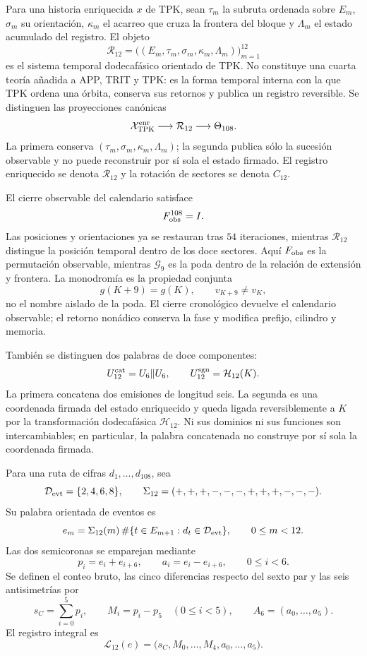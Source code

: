 Para una historia enriquecida \(x\) de TPK, sean \(\tau_m\) la subruta
ordenada sobre \(E_m\), \(\sigma_m\) su orientación, \(\kappa_m\) el acarreo
que cruza la frontera del bloque y \(\Lambda_m\) el estado acumulado del
registro. El objeto
\[
 \mathcal R_{12}
 =\bigl((E_m,\tau_m,\sigma_m,\kappa_m,\Lambda_m)\bigr)_{m=1}^{12}
\]
es el sistema temporal dodecafásico orientado de TPK. No constituye una cuarta
teoría añadida a APP, TRIT y TPK: es la forma temporal interna con la que
TPK ordena una órbita, conserva sus retornos y publica un registro
reversible. Se distinguen las proyecciones canónicas
\[
 \mathcal X_{\rm TPK}^{\rm enr}
 \longrightarrow \mathcal R_{12}
 \longrightarrow \Theta_{108}.
\]
La primera conserva \((\tau_m,\sigma_m,\kappa_m,\Lambda_m)\); la segunda
publica sólo la sucesión observable y no puede reconstruir por sí sola el
estado firmado. El registro enriquecido se denota \(\mathcal R_{12}\) y la
rotación de sectores se denota \(C_{12}\).

El cierre observable del calendario satisface
\[
 F_{\rm obs}^{108}=I.
\]
Las posiciones y orientaciones ya se restauran tras \(54\) iteraciones,
mientras \(\mathcal R_{12}\) distingue la posición temporal dentro de los
doce sectores. Aquí \(F_{\rm obs}\) es la permutación observable, mientras
\(\mathcal G_9\) es la poda dentro de la relación de extensión y frontera.
La monodromía es la propiedad conjunta
\[
 g(K+9)=g(K),\qquad v_{K+9}\ne v_K,
\]
no el nombre aislado de la poda. El cierre cronológico devuelve el calendario
observable; el retorno nonádico conserva la fase y modifica prefijo, cilindro
y memoria.

También se distinguen dos palabras de doce componentes:
\[
 U_{12}^{\rm cat}=U_6\Vert U_6,
 \qquad
 U_{12}^{\rm sgn}=\mathcal H_{12}(K).
\]
La primera concatena dos emisiones de longitud seis. La segunda es una
coordenada firmada del estado enriquecido y queda ligada reversiblemente a
\(K\) por la transformación dodecafásica \(\mathcal H_{12}\). Ni sus dominios
ni sus funciones son intercambiables; en particular, la palabra concatenada
no construye por sí sola la coordenada firmada.

\begin{definition}
\label{def:registro-dodecafasico-rev7}
Para una ruta de cifras \(d_1,\ldots,d_{108}\), sea
\[
 \mathcal D_{\rm evt}=\{2,4,6,8\},\qquad
 \Sigma_{12}=(+,+,+,-,-,-,+,+,+,-,-,-).
\]
Su palabra orientada de eventos es
\[
 e_m=\Sigma_{12}(m)\,
 \#\{t\in E_{m+1}:d_t\in\mathcal D_{\rm evt}\},
 \qquad 0\le m<12.
\]
Las dos semicoronas se emparejan mediante
\[
 p_i=e_i+e_{i+6},\qquad
 a_i=e_i-e_{i+6},\qquad 0\le i<6.
\]
Se definen el conteo bruto, las cinco diferencias respecto del sexto par y
las seis antisimetrías por
\[
 s_C=\sum_{i=0}^{5}p_i,\qquad
 M_i=p_i-p_5\quad(0\le i<5),\qquad
 A_6=(a_0,\ldots,a_5).
\]
El registro integral es
\[
 \mathscr L_{12}(e)
 =\bigl(s_C,M_0,\ldots,M_4,a_0,\ldots,a_5\bigr).
\]
\end{definition}

